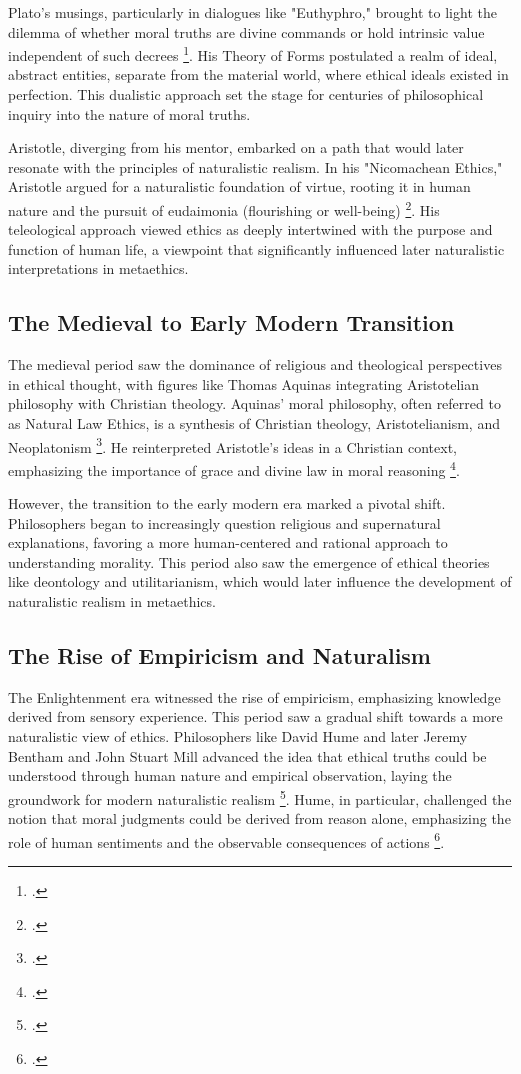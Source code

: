 \documentclass[12pt,a4paper]{article}
\begin{document}
Plato’s musings, particularly in dialogues like "Euthyphro," brought to light the dilemma of whether moral truths are divine commands or hold intrinsic value independent of such decrees \footcite[241-256]{Wiles2014}. His Theory of Forms postulated a realm of ideal, abstract entities, separate from the material world, where ethical ideals existed in perfection. This dualistic approach set the stage for centuries of philosophical inquiry into the nature of moral truths. 

Aristotle, diverging from his mentor, embarked on a path that would later resonate with the principles of naturalistic realism. In his "Nicomachean Ethics," Aristotle argued for a naturalistic foundation of virtue, rooting it in human nature and the pursuit of eudaimonia (flourishing or well-being) \footcite[121-147]{Leibowitz2013}. His teleological approach viewed ethics as deeply intertwined with the purpose and function of human life, a viewpoint that significantly influenced later naturalistic interpretations in metaethics.

\subsection{The Medieval to Early Modern Transition}
The medieval period saw the dominance of religious and theological perspectives in ethical thought, with figures like Thomas Aquinas integrating Aristotelian philosophy with Christian theology. Aquinas' moral philosophy, often referred to as Natural Law Ethics, is a synthesis of Christian theology, Aristotelianism, and Neoplatonism \footcite[126-142]{Stančienė2014}. He reinterpreted Aristotle’s ideas in a Christian context, emphasizing the importance of grace and divine law in moral reasoning \footcite[128-150]{Shanley2002}. 

However, the transition to the early modern era marked a pivotal shift. Philosophers began to increasingly question religious and supernatural explanations, favoring a more human-centered and rational approach to understanding morality. This period also saw the emergence of ethical theories like deontology and utilitarianism, which would later influence the development of naturalistic realism in metaethics.

\subsection{The Rise of Empiricism and Naturalism}
The Enlightenment era witnessed the rise of empiricism, emphasizing knowledge derived from sensory experience. This period saw a gradual shift towards a more naturalistic view of ethics. Philosophers like David Hume and later Jeremy Bentham and John Stuart Mill advanced the idea that ethical truths could be understood through human nature and empirical observation, laying the groundwork for modern naturalistic realism \footcite[298-350]{Skorupski2021}. Hume, in particular, challenged the notion that moral judgments could be derived from reason alone, emphasizing the role of human sentiments and the observable consequences of actions \footcite[1-11]{Ducheyne2017}.
\end{document}
